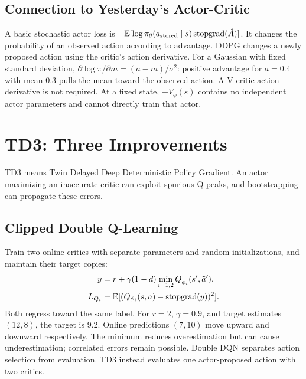 \subsection{Connection to Yesterday's Actor-Critic}
A basic stochastic actor loss is
$-\mathbb{E}[\log\pi_\theta(a_{\rm stored}\mid s)\operatorname{stopgrad}(\hat A)]$.
It changes the probability of an observed action according to advantage.
DDPG changes a newly proposed action using the critic's action derivative.
For a Gaussian with fixed standard deviation,
$\partial\log\pi/\partial m=(a-m)/\sigma^2$:
positive advantage for $a=0.4$ with mean $0.3$ pulls the mean toward
the observed action. A V-critic action derivative is not required.
At a fixed state, $-V_\phi(s)$ contains no independent actor parameters
and cannot directly train that actor.

\section{TD3: Three Improvements}
TD3 means Twin Delayed Deep Deterministic Policy Gradient.
An actor maximizing an inaccurate critic can exploit spurious Q peaks,
and bootstrapping can propagate these errors.

\subsection{Clipped Double Q-Learning}
Train two online critics with separate parameters and random
initializations, and maintain their target copies:
\begin{align}
y&=r+\gamma(1-d)\min_{i=1,2}Q_{\bar\phi_i}(s',\tilde a'),\\
L_{Q_i}&=\mathbb{E}[(Q_{\phi_i}(s,a)-\operatorname{stopgrad}(y))^2].
\end{align}
Both regress toward the same label. For $r=2$, $\gamma=0.9$,
and target estimates $(12,8)$, the target is $9.2$.
Online predictions $(7,10)$ move upward and downward respectively.
The minimum reduces overestimation but can cause underestimation;
correlated errors remain possible.
Double DQN separates action selection from evaluation.
TD3 instead evaluates one actor-proposed action with two critics.

